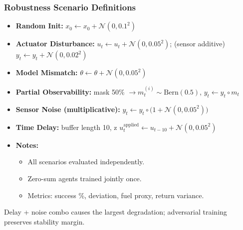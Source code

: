 \begin{frame}
  \frametitle{Robustness Scenario Definitions}
  \small
  \begin{itemize}
    \item \textbf{Random Init:} $x_0 \leftarrow x_0 + \mathcal{N}(0,0.1^2)$
    \item \textbf{Actuator Disturbance:} $u_t \leftarrow u_t + \mathcal{N}(0,0.05^2)$; (sensor additive) $y_t \leftarrow y_t + \mathcal{N}(0,0.02^2)$
    \item \textbf{Model Mismatch:} $\theta \leftarrow \theta + \mathcal{N}(0,0.05^2)$
    \item \textbf{Partial Observability:} mask 50\% $\to m_t^{(i)}\sim \mathrm{Bern}(0.5)$, $y_t \leftarrow y_t \circ m_t$
    \item \textbf{Sensor Noise (multiplicative):} $y_t \leftarrow y_t \circ \bigl(1 + \mathcal{N}(0,0.05^2)\bigr)$
    \item \textbf{Time Delay:} buffer length 10, z
      $u_t^{\mathrm{applied}} \leftarrow u_{t-10} + \mathcal{N}(0,0.05^2)$
    \item \textbf{Notes:}
      \begin{itemize}
        \small
        \setlength{\itemsep}{1pt}
        \item All scenarios evaluated independently.
        \item Zero-sum agents trained jointly once.
        \item Metrics: success \%, deviation, fuel proxy, return variance.
      \end{itemize}
  \end{itemize}
  \vspace{2pt}
  \begin{center}
    \color{mydarkblue}\tiny
    Delay + noise combo causes the largest degradation; adversarial training preserves stability margin.
  \end{center}
\end{frame}
